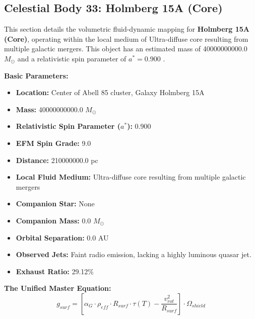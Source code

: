 \documentclass[11pt, a4paper]{article}
\begin{document}
\clearpage
\subsection{Celestial Body 33: Holmberg 15A (Core)}
This section details the volumetric fluid-dynamic mapping for \textbf{Holmberg 15A (Core)}, operating within the local medium of Ultra-diffuse core resulting from multiple galactic mergers. This object has an estimated mass of 40000000000.0 $M_{\odot}$ and a relativistic spin parameter of $a^* = 0.900$ \cite{mehrgan2019, ned}.

\vspace{0.5em}
\noindent \textbf{Basic Parameters:}
\begin{itemize}
  \item \textbf{Location:} Center of Abell 85 cluster, Galaxy Holmberg 15A
  \item \textbf{Mass:} 40000000000.0 $M_{\odot}$
  \item \textbf{Relativistic Spin Parameter ($a^*$):} 0.900
  \item \textbf{EFM Spin Grade:} 9.0
  \item \textbf{Distance:} 210000000.0 pc
  \item \textbf{Local Fluid Medium:} Ultra-diffuse core resulting from multiple galactic mergers
  \item \textbf{Companion Star:} None
  \item \textbf{Companion Mass:} 0.0 $M_{\odot}$
  \item \textbf{Orbital Separation:} 0.0 AU
  \item \textbf{Observed Jets:} Faint radio emission, lacking a highly luminous quasar jet.
  \item \textbf{Exhaust Ratio:} 29.12\%
\end{itemize}

\vspace{0.5em}
\noindent \textbf{The Unified Master Equation:}
$$ g_{surf} = \left[ \alpha_G \cdot \rho_{eff} \cdot R_{surf} \cdot \tau(T) - \frac{v_{rot}^2}{R_{surf}} \right] \cdot \Omega_{shield} $$
\end{document}
